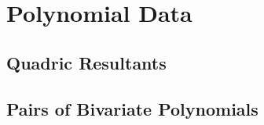 \section{Polynomial Data}


\subsection{Quadric Resultants}

\subsection{Pairs of Bivariate Polynomials}


